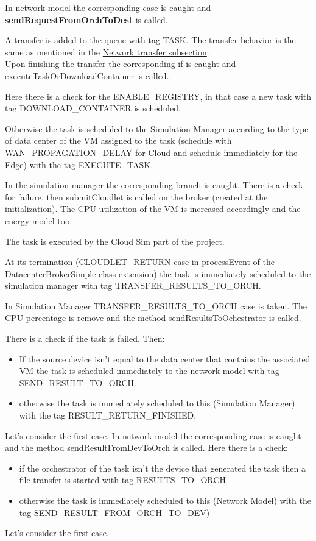 \documentclass[12pt]{report}
\begin{document}
In network model the corresponding case is caught and \mbox{\textbf{sendRequestFromOrchToDest}} is called.

A transfer is added to the queue with tag TASK. The transfer behavior is the same as mentioned in the \hyperref[network_transfer]{Network transfer subsection}.\\
Upon finishing the transfer the corresponding if is caught and executeTaskOrDownloadContainer is called.

Here there is a check for the ENABLE\_REGISTRY, in that case a new task with tag DOWNLOAD\_CONTAINER is scheduled.

Otherwise the task is scheduled to the Simulation Manager according to the type of data center of the VM assigned to the task (schedule with WAN\_PROPAGATION\_DELAY for Cloud and schedule immediately for the Edge) with the tag EXECUTE\_TASK.

In the simulation manager the corresponding branch is caught. There is a check for failure, then submitCloudlet is called on the broker (created at the initialization). The CPU utilization of the VM is increased accordingly and the energy model too.

The task is executed by the Cloud Sim part of the project.

At its termination (CLOUDLET\_RETURN case in processEvent of the DatacenterBrokerSimple class extension) the task is immediately scheduled to the simulation manager with tag TRANSFER\_RESULTS\_TO\_ORCH.

In Simulation Manager TRANSFER\_RESULTS\_TO\_ORCH case is taken. The CPU percentage is remove and the method sendResultsToOchestrator is called.

There is a check if the task is failed. Then:
\begin{itemize}
	\item If the source device isn't equal to the data center that contains the associated VM the task is scheduled immediately to the network model with tag SEND\_RESULT\_TO\_ORCH.
	\item otherwise the task is immediately scheduled to this (Simulation Manager) with the tag RESULT\_RETURN\_FINISHED.
\end{itemize}
Let's consider the first case.
In network model the corresponding case is caught and the method sendResultFromDevToOrch is called. Here there is a check:
\begin{itemize}
	\item if the orchestrator of the task isn't the device that generated the task then a file transfer is started with tag RESULTS\_TO\_ORCH
	\item otherwise the task is immediately scheduled to this (Network Model) with the tag SEND\_RESULT\_FROM\_ORCH\_TO\_DEV)
\end{itemize}
Let's consider the first case.
\end{document}
